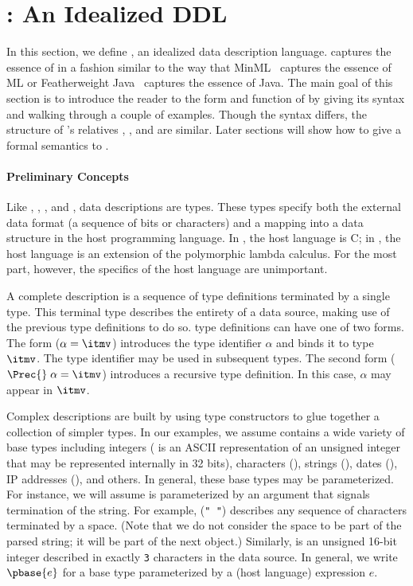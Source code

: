 \section{\ipads{}:  An Idealized DDL}
\label{sec:ipads}

In this section, we define \ipads{}, an idealized data description
language.  \ipads{} captures the essence of \padsc{} in a fashion
similar to the way that MinML~\cite{harper:plbook} captures the essence of ML or Featherweight
Java~\cite{igarasi+:featherweight} captures the essence of Java.  The main goal of this section is to introduce
the reader to the form and function of \ipads{} by giving its syntax
and walking through a couple of examples.  Though the syntax differs,
the structure of \padsc{}'s relatives \padsml{}, \packettypes{}, and
\datascript{} are similar.  Later sections will show how to give a
formal semantics to \ipads{}.

\paragraph*{Preliminary Concepts}
Like \padsc{}, \padsml{}, 
\packettypes{}, and \datascript{}, \ipads{} data
descriptions are types.  These types specify both the external data
format (a sequence of bits or characters) and a mapping into a
data structure in the host programming language.  In \padsc{},
the host language is C; in \ipads, the host language is an extension
of the polymorphic lambda calculus.  For the most part, however, the
specifics of the host language are unimportant.

A complete \ipads{} description is a sequence of type definitions
terminated by a single type.  This terminal type describes the
entirety of a data source, making use of the previous 
type definitions to do so.  \ipads{} type definitions can have one of
two forms.  The form ($\alpha = \itmv$) introduces the type identifier
$\alpha$ and binds it to \ipads{} type $\itmv$.
The type identifier may be used in
subsequent types.  The second form  ($\Prec{}\; \alpha = \itmv$) introduces
a recursive type definition.  In this case, $\alpha$ may appear in 
$\itmv$.

Complex \ipads{} descriptions are built by using type constructors to glue together a collection of simpler types. In our examples, we
assume \ipads{} contains a wide variety of base types including
integers (\Puint{} is an ASCII representation of an unsigned
integer that may be represented internally in 32 bits), 
characters (\Pchar), strings (\Pstring), dates
(\Pdate), IP addresses (\Pip), and others.  In general, these base
types may be parameterized.  For instance, we will assume \Pstring{} is
parameterized by an argument that signals termination of the
string.  For example, \Pstring({\tt " "}) describes any sequence of
characters terminated by a space. 
(Note that we do not consider the space to be part of the parsed string; 
it will be part of the next object.)
Similarly,  is an unsigned 16-bit
integer described in exactly {\tt 3} characters in the data source.
In general, we write $\pbase{e}$ for a base type parameterized by a
(host language) expression $e$.

